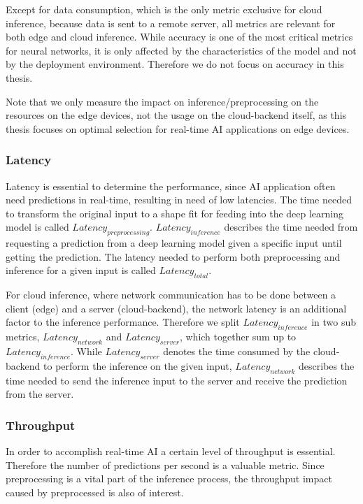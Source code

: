 Except for data consumption, which is the only metric exclusive for cloud inference, because data is sent to a remote server, all metrics are relevant for both edge and cloud inference.
While accuracy is one of the most critical metrics for neural networks, it is only affected by the characteristics of the model and not by the deployment environment. Therefore we do not focus on accuracy in this thesis.

Note that we only measure the impact on inference/preprocessing on the resources on the edge devices, not the usage on the cloud-backend itself, as this thesis focuses on optimal selection for real-time AI applications on edge devices.
\subsubsection{Latency}
\label{chap:latency}
Latency is essential to determine the performance, since AI application often need predictions in real-time, resulting in need of low latencies.
The time needed to transform the original input to a shape fit for feeding into the deep learning model is called $Latency_{preprocessing}$.
$Latency_{inference}$ describes the time needed from requesting a prediction from a deep learning model given a specific input until getting the prediction.
The latency needed to perform both preprocessing and inference for a given input is called $Latency_{total}$.

For cloud inference, where network communication has to be done between a client (edge) and a server (cloud-backend), the network latency is an additional factor to the inference performance.
Therefore we split $Latency_{inference}$ in two sub metrics, $Latency_{network}$ and $Latency_{server}$, which together sum up to $Latency_{inference}$.
While $Latency_{server}$ denotes the time consumed by the cloud-backend to perform the inference on the given input, $Latency_{network}$ describes the time needed to send the inference input to the server and receive the prediction from the server.
\subsubsection{Throughput}
In order to accomplish real-time AI a certain level of throughput is essential. Therefore the number of predictions per second is a valuable metric. 
Since preprocessing is a vital part of the inference process, the throughput impact caused by preprocessed is also of interest.

